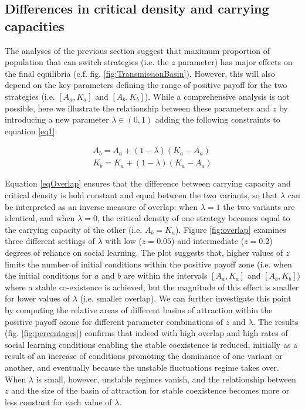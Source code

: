 \documentclass[review,authoryear]{elsarticle}
\begin{document}
\subsection{Differences in critical density and carrying capacities}

The analyses of the previous section suggest that maximum proportion of population that can switch strategies (i.e. the $z$ parameter) has major effects on the final equilibria (c.f. fig. \ref{fig:TransmissionBasin}). However, this will also depend on the key parameters defining the range of positive payoff for the two strategies (i.e. $[A_a,K_a]$ and $[A_b,K_b]$). While a comprehensive analysis is not possible, here we illustrate the relationship between these parameters and $z$ by introducing a new parameter $\lambda \in (0,1)$ adding the following constraints to equation \eqref{eq1}: 

\begin{equation}
\begin{aligned}
\label{eqOverlap}
A_b = A_a + (1-\lambda)(K_a-A_a)\\
K_b = K_a + (1-\lambda)(K_a-A_a)
\end{aligned}
\end{equation}

Equation \eqref{eqOverlap} ensures that the difference between carrying capacity and critical density is hold constant and equal between the two variants, so that $\lambda$ can be interpreted as an inverse  measure of overlap: when $\lambda=1$ the two variants are identical, and when $\lambda=0$, the critical density of one strategy becomes equal to the carrying capacity of the other (i.e. $A_b=K_a$). Figure \ref{fig:overlap} examines three different settings of $\lambda$  with low ($z=0.05$) and intermediate ($z=0.2$) degrees of reliance on social learning. The plot suggests that, higher values of $z$ limits the number of initial conditions within the positive payoff zone (i.e. when the initial conditions for $a$ and $b$ are within the intervals $[A_a,K_a]$ and $[A_b,K_b]$) where a stable co-existence is achieved, but the magnitude of this effect is smaller for lower values of $\lambda$ (i.e. smaller overlap). We can further investigate this point by computing the relative areas of different basins of attraction within the positive payoff ozone for different parameter combinations of $z$ and $\lambda$. The results (fig. \ref{fig:percentages}) confirms that indeed with high overlap and high rates of social learning conditions enabling the stable coexistence is reduced, initially as a result of an increase of conditions promoting the dominance of one variant or another, and eventually because the unstable fluctuations regime takes over. When  $\lambda$ is small, however, unstable regimes vanish, and the relationship between $z$ and the size of the basin of attraction for stable coexistence becomes more or less constant for each value of $\lambda$. 
\end{document}
